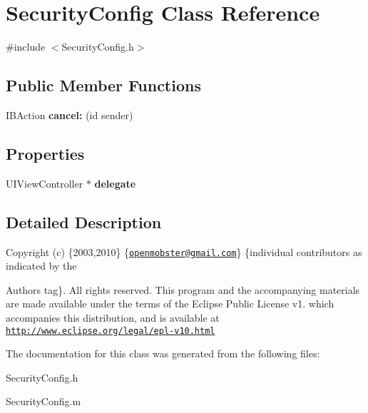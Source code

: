 \hypertarget{interface_security_config}{
\section{\-Security\-Config \-Class \-Reference}
\label{interface_security_config}
}


{\ttfamily \#include $<$\-Security\-Config.\-h$>$}

\subsection*{\-Public \-Member \-Functions}
\begin{DoxyCompactItemize}
\item 
\hypertarget{interface_security_config_abf4186668bc2c37aeea05970db07b283}{
\-I\-B\-Action {\bfseries cancel\-:} (id sender)}
\label{interface_security_config_abf4186668bc2c37aeea05970db07b283}

\end{DoxyCompactItemize}
\subsection*{\-Properties}
\begin{DoxyCompactItemize}
\item 
\hypertarget{interface_security_config_a4ac32a0caa7ae861728877afc0fb18b0}{
\-U\-I\-View\-Controller $\ast$ {\bfseries delegate}}
\label{interface_security_config_a4ac32a0caa7ae861728877afc0fb18b0}

\end{DoxyCompactItemize}


\subsection{\-Detailed \-Description}
\-Copyright (c) \{2003,2010\} \{\href{mailto:openmobster@gmail.com}{\tt openmobster@gmail.\-com}\} \{individual contributors as indicated by the \begin{DoxyAuthor}{\-Authors}
tag\}. \-All rights reserved. \-This program and the accompanying materials are made available under the terms of the \-Eclipse \-Public \-License v1. which accompanies this distribution, and is available at \href{http://www.eclipse.org/legal/epl-v10.html}{\tt http\-://www.\-eclipse.\-org/legal/epl-\/v10.\-html} 
\end{DoxyAuthor}


\-The documentation for this class was generated from the following files\-:\begin{DoxyCompactItemize}
\item 
\-Security\-Config.\-h\item 
\-Security\-Config.\-m\end{DoxyCompactItemize}
